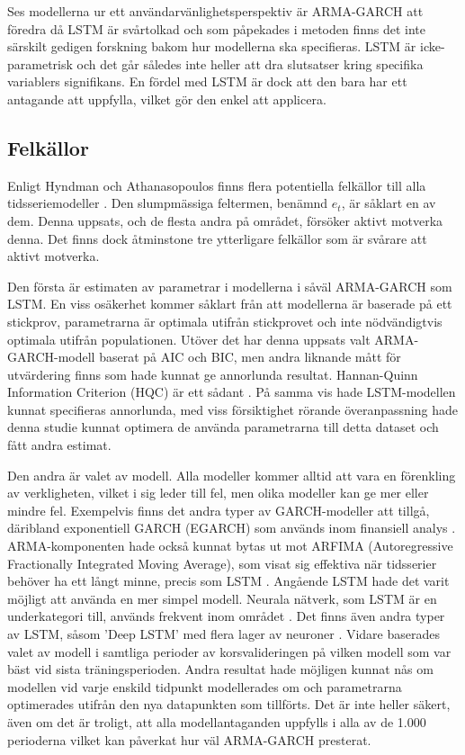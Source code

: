 \documentclass[11pt]{article}
\numberwithin{equation}{section}
\numberwithin{table}{section}
\numberwithin{figure}{section}
\begin{document}
Ses modellerna ur ett användarvänlighetsperspektiv är ARMA-GARCH att föredra då LSTM är svårtolkad och som påpekades i metoden finns det inte särskilt gedigen forskning bakom hur modellerna ska specifieras. LSTM är icke-parametrisk och det går således inte heller att dra slutsatser kring specifika variablers signifikans. En fördel med LSTM är dock att den bara har ett antagande att uppfylla, vilket gör den enkel att applicera. 

\subsection{Felkällor}
Enligt Hyndman och Athanasopoulos \parencite*[][,s.452 f.]{hyndman2018forecasting} finns flera potentiella felkällor till alla tidsseriemodeller . Den slumpmässiga feltermen, benämnd \(e_t\), är såklart en av dem. Denna uppsats, och de flesta andra på området, försöker aktivt motverka denna. Det finns dock åtminstone tre ytterligare felkällor som är svårare att aktivt motverka. 

Den första är estimaten av parametrar i modellerna i såväl ARMA-GARCH som LSTM. En viss osäkerhet kommer såklart från att modellerna är baserade på ett stickprov, parametrarna är optimala utifrån stickprovet och inte nödvändigtvis optimala utifrån populationen. Utöver det har denna uppsats valt ARMA-GARCH-modell baserat på AIC och BIC, men andra liknande mått för utvärdering finns som hade kunnat ge annorlunda resultat. Hannan-Quinn Information Criterion (HQC) är ett sådant \parencite{hannan1979determination}. På samma vis hade LSTM-modellen kunnat specifieras annorlunda, med viss försiktighet rörande överanpassning hade denna studie kunnat optimera de använda parametrarna till detta dataset och fått andra estimat. 

Den andra är valet av modell. Alla modeller kommer alltid att vara en förenkling av verkligheten, vilket i sig leder till fel, men olika modeller kan ge mer eller mindre fel. Exempelvis finns det andra typer av GARCH-modeller att tillgå, däribland exponentiell GARCH (EGARCH) som används inom finansiell analys \parencite{nelson1991conditional}. ARMA-komponenten hade också kunnat bytas ut mot ARFIMA (Autoregressive Fractionally Integrated Moving Average), som visat sig effektiva när tidsserier behöver ha ett långt minne, precis som LSTM \parencite{taqqu1995estimators}. Angående LSTM hade det varit möjligt att använda en mer simpel modell. Neurala nätverk, som LSTM är en underkategori till, används frekvent inom området \parencite[se t.ex.][]{rather2015recurrent, li2010applications}. Det finns även andra typer av LSTM, såsom 'Deep LSTM' med flera lager av neuroner \parencite[se applikation i][]{hansson2017stock}. Vidare baserades valet av modell i samtliga perioder av korsvalideringen på vilken modell som var bäst vid sista träningsperioden. Andra resultat hade möjligen kunnat nås om modellen vid varje enskild tidpunkt modellerades om och parametrarna optimerades utifrån den nya datapunkten som tillförts. Det är inte heller säkert, även om det är troligt, att alla modellantaganden uppfylls i alla av de 1.000 perioderna vilket kan påverkat hur väl ARMA-GARCH presterat. 
\end{document}

